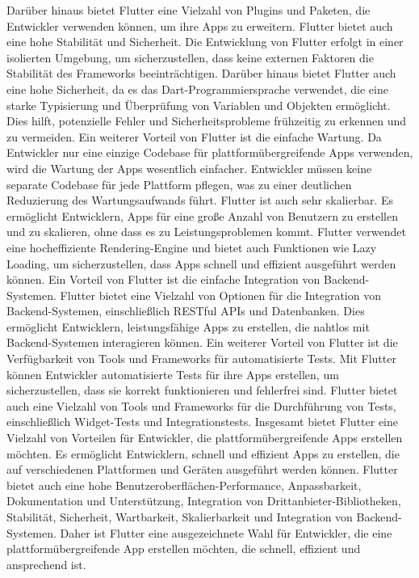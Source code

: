 Darüber hinaus bietet Flutter eine Vielzahl von Plugins und Paketen, die Entwickler verwenden können, um ihre Apps zu erweitern.
Flutter bietet auch eine hohe Stabilität und Sicherheit. Die Entwicklung von Flutter erfolgt in einer isolierten Umgebung, um sicherzustellen, dass keine externen Faktoren die Stabilität des Frameworks beeinträchtigen. 
Darüber hinaus bietet Flutter auch eine hohe Sicherheit, da es das Dart-Programmiersprache verwendet, die eine starke Typisierung und Überprüfung von Variablen und Objekten ermöglicht. 
Dies hilft, potenzielle Fehler und Sicherheitsprobleme frühzeitig zu erkennen und zu vermeiden.
Ein weiterer Vorteil von Flutter ist die einfache Wartung. 
Da Entwickler nur eine einzige Codebase für plattformübergreifende Apps verwenden, wird die Wartung der Apps wesentlich einfacher. 
Entwickler müssen keine separate Codebase für jede Plattform pflegen, was zu einer deutlichen Reduzierung des Wartungsaufwands führt.
Flutter ist auch sehr skalierbar. Es ermöglicht Entwicklern, Apps für eine große Anzahl von Benutzern zu erstellen und zu skalieren, ohne dass es zu Leistungsproblemen kommt. 
Flutter verwendet eine hocheffiziente Rendering-Engine und bietet auch Funktionen wie Lazy Loading, um sicherzustellen, dass Apps schnell und effizient ausgeführt werden können.
Ein Vorteil von Flutter ist die einfache Integration von Backend-Systemen. 
Flutter bietet eine Vielzahl von Optionen für die Integration von Backend-Systemen, einschließlich RESTful APIs und Datenbanken. 
Dies ermöglicht Entwicklern, leistungsfähige Apps zu erstellen, die nahtlos mit Backend-Systemen interagieren können.
Ein weiterer Vorteil von Flutter ist die Verfügbarkeit von Tools und Frameworks für automatisierte Tests. 
Mit Flutter können Entwickler automatisierte Tests für ihre Apps erstellen, um sicherzustellen, dass sie korrekt funktionieren und fehlerfrei sind. 
Flutter bietet auch eine Vielzahl von Tools und Frameworks für die Durchführung von Tests, einschließlich Widget-Tests und Integrationstests.
Insgesamt bietet Flutter eine Vielzahl von Vorteilen für Entwickler, die plattformübergreifende Apps erstellen möchten.
Es ermöglicht Entwicklern, schnell und effizient Apps zu erstellen, die auf verschiedenen Plattformen und Geräten ausgeführt werden können. 
\newline
Flutter bietet auch eine hohe Benutzeroberflächen-Performance, Anpassbarkeit,
\newline
Dokumentation und Unterstützung, Integration von Drittanbieter-Bibliotheken, Stabilität, Sicherheit, Wartbarkeit, Skalierbarkeit und Integration von Backend-Systemen. 
Daher ist Flutter eine ausgezeichnete Wahl für Entwickler, die eine plattformübergreifende App erstellen möchten, die schnell, effizient und ansprechend ist.
\newpage

